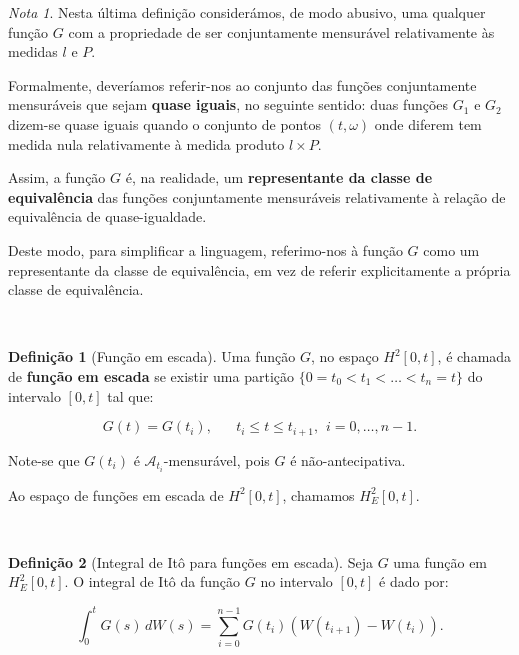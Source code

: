 \documentclass[
  11pt,
  a4paper,
]{book}
\theoremstyle{definition}
\newtheorem{definition}{Definição}[chapter]
\theoremstyle{definition}
\theoremstyle{definition}
\theoremstyle{definition}
\theoremstyle{remark}
\newtheorem*{remark}{Nota }
\begin{document}
\begin{remark}
Nesta última definição considerámos, de modo abusivo, uma qualquer função \(G\) com a propriedade de ser conjuntamente mensurável relativamente às medidas \(l\) e \(P\).

Formalmente, deveríamos referir-nos ao conjunto das funções conjuntamente mensuráveis que sejam \textbf{quase iguais}, no seguinte sentido: duas funções \(G_1\) e \(G_2\) dizem-se quase iguais quando o conjunto de pontos \((t,\omega)\) onde diferem tem medida nula relativamente à medida produto \(l \times P\).

Assim, a função \(G\) é, na realidade, um \textbf{representante da classe de equivalência} das funções conjuntamente mensuráveis relativamente à relação de equivalência de quase-igualdade.

Deste modo, para simplificar a linguagem, referimo-nos à função \(G\) como um representante da classe de equivalência, em vez de referir explicitamente a própria classe de equivalência.
\end{remark}

\(\,\)

\begin{definition}[Função em escada]
Uma função \(G\), no espaço \(H^2[0,t]\), é chamada de \textbf{função em escada} se existir uma partição \(\{0 = t_0 < t_1 < \ldots < t_n = t\}\) do intervalo \([0,t]\) tal que:

\[
G(t) = G(t_i), \hspace{20pt} t_i \leq t \leq t_{i+1}, \hspace{5pt} i = 0, \ldots, n-1.
\]

Note-se que \(G(t_i)\) é \(\mathcal{A}_{t_i}\)-mensurável, pois \(G\) é não-antecipativa.

Ao espaço de funções em escada de \(H^2[0,t]\), chamamos \(H_E^2[0,t]\).
\end{definition}

\(\,\)

\begin{definition}[Integral de Itô para funções em escada]
Seja \(G\) uma função em \(H_E^2[0,t]\). O integral de Itô da função \(G\) no intervalo \([0,t]\) é dado por:

\[
\int_0^t G(s) \, dW(s) = \sum_{i=0}^{n-1} G(t_i)\left(W(t_{i+1}) - W(t_i)\right).
\]
\end{definition}

\(\,\)
\end{document}
